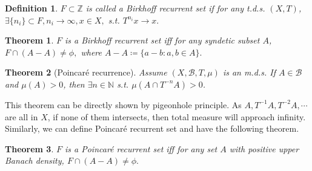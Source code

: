 \documentclass[12pt]{article}
\newtheorem{definition}{Definition}
\newtheorem{theorem}{Theorem}
\begin{document}
\begin{definition}
$F\subset\mathbb{Z}$ is called a Birkhoff recurrent set if for any t.d.s. $(X,T)$, $\exists\{n_i\}\subset F,n_i\to\infty,x\in X, $ s.t. $T^{n_i}x\to x. $
\end{definition}
\begin{theorem}
$F$ is a Birkhoff recurrent set iff for any syndetic subset $A$, $F\cap(A-A)\ne\phi, $ where $A-A\coloneqq \{a-b:a,b\in A \} .$
\end{theorem}
\begin{theorem}[Poincar\'e recurrence]
Assume $(X,\mathcal{B},T,\mu)$ is an m.d.s. If $A\in\mathcal{B}$ and $\mu(A)>0$, then $\exists n\in \mathbb{N} $ s.t. $\mu(A\cap T^{-n}A) >0$.
\end{theorem}
This theorem can be directly shown by pigeonhole principle. As $A,T^{-1}A,T^{-2}A,\cdots $ are all in $X$, if none of them intersects, then total measure will approach infinity. Similarly, we can define Poincar\'e recurrent set and have the following theorem.
\begin{theorem}
$F$ is a Poincar\'e recurrent set iff for any set $A$ with positive upper Banach density, $F\cap (A-A)\ne \phi. $
\end{theorem}
\end{document}
